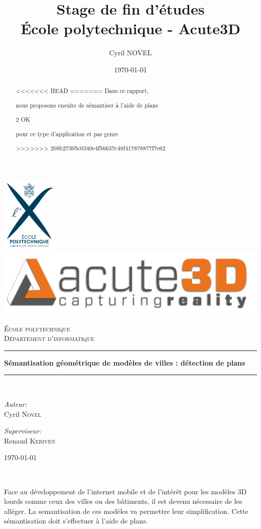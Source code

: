 ﻿\documentclass[12pt, twoside]{article}
\title{Stage de fin d'études\\
\large{École polytechnique - Acute3D}}
\author{Cyril NOVEL}
\date{\today}
\begin{document}
\begin{titlepage}
\begin{center}
\includegraphics[width=0.20\textwidth]{LogoX.jpg}~\\[0.5cm]
\includegraphics[height=0.12\textwidth]{LogoA3D.jpg}~\\[1cm]

\textsc{\LARGE École polytechnique}\\[0.5cm]

\textsc{\Large Département d'informatique}\\[1.5cm]

\rule{\textwidth}{.4pt}
{ \huge \bfseries Sémantisation géométrique de modèles de villes : détection de plans \\[0.4cm] }

\rule{\textwidth}{.4pt}\\[1.5cm]

\begin{minipage}{0.4\textwidth}
\begin{flushleft} \large
\emph{Auteur:}\\
Cyril \textsc{Novel}
\end{flushleft}
\end{minipage}
\begin{minipage}{0.4\textwidth}
\begin{flushright} \large
\emph{Superviseur:} \\
Renaud \textsc{Keriven}
\end{flushright}
\end{minipage}

\vfill
{\large \today}
\end{center}
\end{titlepage}

\newpage
\begin{abstract}
<<<<<<< HEAD
=======
Dans ce rapport,

nous proposons ensuite de sémantiser à l'aide de plans

2 OK

pour ce type d'application et pas genre

>>>>>>> 208b27305c0340e4f56637c48f417878877f7e62
\end{abstract}~\\[5cm]
Face au développement de l'internet mobile et de l'intérêt pour les modèles 3D lourds comme ceux des villes ou des bâtiments, il est devenu nécessaire de les alléger. La semantisation de ces modèles va permettre leur simplification. Cette sémantisation doit s'effectuer à l'aide de plans.
\end{document}
